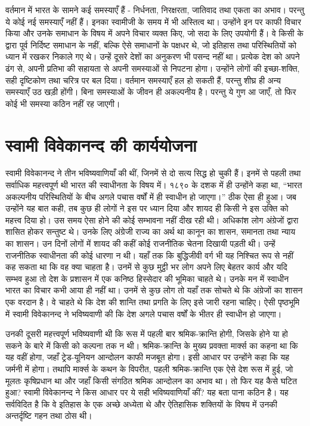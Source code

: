 वर्तमान में भारत के सामने कई समस्याएँ हैं - निर्धनता, निरक्षरता, जातिवाद तथा एकता का अभाव। परन्तु ये कोई नई समस्याएँ नहीं हैं। इनका स्वामीजी के समय में भी अस्तित्व था। उन्होंने इन पर काफी विचार किया और उनके समाधान के विषय में अपने विचार व्यक्त किए, जो सदा के लिए उपयोगी हैं। वे किसी के द्वारा पूर्व निर्दिष्ट समाधान के नहीं, बल्कि ऐसे समाधानों के पक्षधर थे, जो इतिहास तथा परिस्थितियों को ध्यान में रखकर निकाले गए थे। उन्हें दूसरे देशों का अनुकरण भी पसन्द नहीं था। प्रत्येक देश को अपने ढंग से, अपनी प्रतिभा की सहायता से अपनी समस्याओं से निपटना होगा। उन्होंने लोगों की इच्छा-शक्ति, सही दृष्टिकोण तथा चरित्र पर बल दिया। वर्तमान समस्याएँ हल हो सकती हैं, परन्तु शीघ्र ही अन्य समस्याएँ उठ खड़ी होंगी। बिना समस्याओं के जीवन ही अकल्पनीय है। परन्तु ये गुण आ जाएँ, तो फिर कोई भी समस्या कठिन नहीं रह जाएगी।


\section*{स्वामी विवेकानन्द की कार्ययोजना}

स्वामी विवेकानन्द ने तीन भविष्यवाणियाँ की थीं, जिनमें से दो सत्य सिद्ध हो चुकी हैं। इनमें से पहली तथा सर्वाधिक महत्त्वपूर्ण थी भारत की स्वाधीनता के विषय में। १८९० के दशक में ही उन्होंने कहा था, “भारत अकल्पनीय परिस्थितियों के बीच अगले पचास वर्षों में ही स्वाधीन हो जाएगा।” ठीक ऐसा ही हुआ। जब उन्होंने यह बात कही, तब कुछ ही लोगों ने इस पर ध्यान दिया और शायद ही किसी ने इस उक्ति को महत्त्व दिया हो। उस समय ऐसा होने की कोई सम्भावना नहीं दीख रही थी। अधिकांश लोग अंग्रेजों द्वारा शासित होकर सन्तुष्ट थे। उनके लिए अंग्रेजी राज्य का अर्थ था कानून का शासन, समानता तथा न्याय का शासन। उन दिनों लोगों में शायद की कहीं कोई राजनीतिक चेतना दिखायी पड़ती थी। उन्हें राजनीतिक स्वाधीनता की कोई धारणा न थी। यहाँ तक कि बुद्धिजीवी वर्ग भी यह निश्चित रूप से नहीं कह सकता था कि वह क्या चाहता है। उनमें से कुछ मुट्ठी भर लोग अपने लिए बेहतर कार्य और यदि सम्भव हुआ तो देश के प्रशासन में एक कनिष्ठ हिस्सेदार की भूमिका चाहते थे। उनके मन में स्वाधीन भारत का विचार कभी आया ही नहीं था। उनमें से कुछ लोग तो यहाँ तक सोचते थे कि अंग्रेजों का शासन एक वरदान है। वे चाहते थे कि देश की शान्ति तथा प्रगति के लिए इसे जारी रहना चाहिए। ऐसी पृष्ठभूमि में स्वामी विवेकानन्द ने भविष्यवाणी की कि देश अगले पचास वर्षों के भीतर ही स्वाधीन हो जाएगा। 

\newpage

उनकी दूसरी महत्त्वपूर्ण भविष्यवाणी थी कि रूस में पहली बार श्रमिक-क्रान्ति होगी, जिसके होने या हो सकने के बारे में किसी को कल्पना तक न थी। श्रमिक-क्रान्ति के मुख्य प्रवक्ता मार्क्स का कहना था कि यह वहीं होगा, जहाँ ट्रेड-यूनियन आन्दोलन काफी मजबूत होगा। इसी आधार पर उन्होंने कहा कि यह जर्मनी में होगा। तथापि मार्क्स के कथन के विपरीत, पहली श्रमिक-क्रान्ति एक ऐसे देश रूस में हुई, जो मूलतः कृषिप्रधान था और जहाँ किसी संगठित श्रमिक आन्दोलन का अभाव था। तो फिर यह कैसे घटित हुआ? स्वामी विवेकानन्द ने किस आधार पर ये सही भविष्यवाणियाँ कीं? यह बता पाना कठिन है। यह सर्वविदित है कि वे इतिहास के एक अच्छे अध्येता थे और ऐतिहासिक शक्तियों के विषय में उनकी अन्तर्दृष्टि गहन तथा ठोस थी। 

